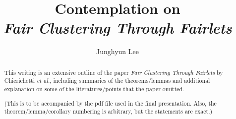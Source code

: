 \documentclass[a4paper, twoside]{report}
\title{Contemplation on \\
{\it Fair Clustering Through Fairlets}}
\author{Junghyun Lee}
\theoremstyle{break}
\begin{document}


\begin{abstract}
This writing is an extensive outline of the paper {\it Fair Clustering Through Fairlets} by Chierichetti {\it et al.}, including summaries of the theorems/lemmas and additional explanation on some of the literatures/points that the paper omitted.

(This is to be accompanied by the pdf file used in the final presentation. Also, the theorem/lemma/corollary numbering is arbitrary, but the statements are exact.)
\end{abstract}

\tableofcontents
\listoffigures








\printbibliography
{}
\end{document}
